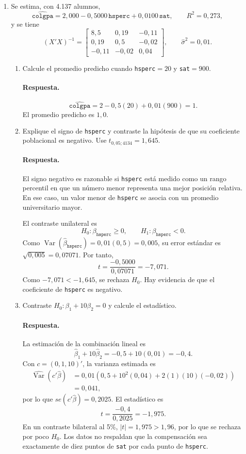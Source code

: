 \documentclass[letterpaper,11pt]{article}
\newcommand{\respuesta}{\color{blue}\paragraph{Respuesta.}}
\begin{document}
\begin{enumerate}[resume]
\item\color{black} Se estima, con 4.137 alumnos,
\[
    \widehat{\texttt{colgpa}}
    =2{,}000-0{,}5000\,\texttt{hsperc}
    +0{,}0100\,\texttt{sat},
    \qquad R^2=0{,}273,
\]
y se tiene
\[
    (X'X)^{-1}=\begin{bmatrix}
        8{,}5 & 0{,}19 & -0{,}11\\
        0{,}19 & 0{,}5 & -0{,}02\\
        -0{,}11 & -0{,}02 & 0{,}04
    \end{bmatrix},
    \qquad \widehat{\sigma}^{2}=0{,}01.
\]
\begin{enumerate}[label=(\alph*)]
    \item\color{black} Calcule el promedio predicho cuando \texttt{hsperc}$=20$ y
    \texttt{sat}$=900$.

    \respuesta
    \[
        \widehat{\texttt{colgpa}}=2-0{,}5(20)+0{,}01(900)=1.
    \]
    El promedio predicho es $1{,}0$.

    \item\color{black} Explique el signo de \texttt{hsperc} y contraste la hipótesis de que
    su coeficiente poblacional es negativo. Use $t_{0{,}05;4134}=1{,}645$.

    \respuesta El signo negativo es razonable si \texttt{hsperc} está medido
    como un rango percentil en que un número menor representa una mejor
    posición relativa. En ese caso, un valor menor de \texttt{hsperc} se
    asocia con un promedio universitario mayor.

    El contraste unilateral es
    \[
        H_0:\beta_{\texttt{hsperc}}\geq 0,
        \qquad H_1:\beta_{\texttt{hsperc}}<0.
    \]
    Como $\operatorname{Var}(\widehat\beta_{\texttt{hsperc}})
    =0{,}01(0{,}5)=0{,}005$, su error estándar es
    $\sqrt{0{,}005}=0{,}07071$. Por tanto,
    \[
        t=\frac{-0{,}5000}{0{,}07071}=-7{,}071.
    \]
    Como $-7{,}071<-1{,}645$, se rechaza $H_0$. Hay evidencia de que el
    coeficiente de \texttt{hsperc} es negativo.

    \item\color{black} Contraste $H_0:\beta_1+10\beta_2=0$ y calcule el estadístico.

    \respuesta La estimación de la combinación lineal es
    \[
        \widehat\beta_1+10\widehat\beta_2=-0{,}5+10(0{,}01)=-0{,}4.
    \]
    Con $c=(0,1,10)'$, la varianza estimada es
    \[
    \begin{aligned}
        \widehat{\operatorname{Var}}(c'\widehat\beta)
        &=0{,}01\left(0{,}5+10^2(0{,}04)+2(1)(10)(-0{,}02)\right)\\
        &=0{,}041,
    \end{aligned}
    \]
    por lo que $se(c'\widehat\beta)=0{,}2025$. El estadístico es
    \[
        t=\frac{-0{,}4}{0{,}2025}=-1{,}975.
    \]
    En un contraste bilateral al 5\%, $|t|=1{,}975>1{,}96$, por lo que se
    rechaza por poco $H_0$. Los datos no respaldan que la compensación sea
    exactamente de diez puntos de \texttt{sat} por cada punto de
    \texttt{hsperc}.
\end{enumerate}

\end{enumerate}
\end{document}
